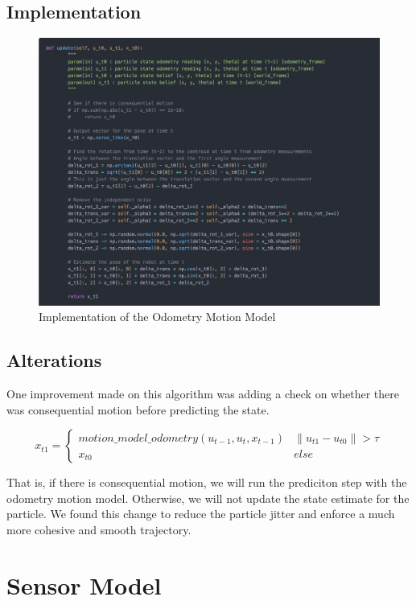 \documentclass[12pt, a4paper]{article}
\begin{document}
\subsection{Implementation}
\begin{figure}[H]
  \begin{center}
    \includegraphics[width=1.0\textwidth]{./results/motion_model_2.png}
    \caption{Implementation of the Odometry Motion Model}
  \end{center}
\end{figure}

\subsection{Alterations}
One improvement made on this algorithm was adding a check on whether there was consequential motion before predicting the state.

\[ 
x_{t1} = \left\{
\begin{array}{ll}
    motion\_model\_odometry(u_{t-1}, u_t, x_{t-1}) & \lVert u_{t1} - u_{t0} \rVert > \tau \\
    x_{t0} & else
\end{array} 
\right. 
\]

\noindent That is, if there is consequential motion, we will run the prediciton step with the odometry motion model. Otherwise, we will not update the state estimate for the particle. We found this change to reduce the particle jitter and enforce a much more cohesive and smooth trajectory.

\clearpage
\section{Sensor Model}
\end{document}
